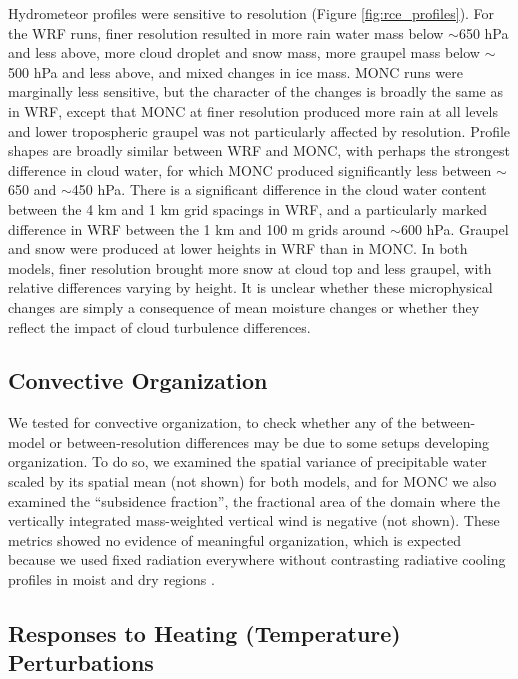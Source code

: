 \documentclass[draft]{agujournal2019}
\begin{document}
Hydrometeor profiles were sensitive to resolution (Figure
\ref{fig:rce_profiles}). For the WRF runs, finer resolution resulted in more
rain water mass below $\sim$650 hPa and less above, more cloud droplet and snow
mass, more graupel mass below $\sim$500 hPa and less above, and mixed changes in
ice mass. MONC runs were marginally less sensitive, but the character
of the changes is broadly the same as in WRF, except that MONC at finer
resolution produced more rain at all levels and lower tropospheric graupel was
not particularly affected by resolution. Profile shapes are broadly similar
between WRF and MONC, with perhaps the strongest difference in cloud water, for
which MONC produced significantly less between $\sim$650 and $\sim$450 hPa.
There is a significant difference in the cloud water content between the 4 km
and 1 km grid spacings in WRF, and a particularly marked difference in WRF
between the 1 km and 100 m grids around $\sim$600 hPa. Graupel and snow were
produced at lower heights in WRF than in MONC. In both models, finer resolution
brought more snow at cloud top and less graupel, with relative differences
varying by height. It is unclear whether these microphysical changes are simply
a consequence of mean moisture changes or whether they reflect the impact of
cloud turbulence differences.

\subsection{Convective Organization}

We tested for convective organization, to check whether any of the between-model
or between-resolution differences may be due to some setups developing
organization. To do so, we examined the spatial variance of precipitable water
scaled by its spatial mean (not shown) for both models, and for MONC we also
examined the ``subsidence fraction'', the fractional area of the domain where
the vertically integrated mass-weighted vertical wind is negative (not shown).
These metrics showed no evidence of meaningful organization, which is expected
because we used fixed radiation everywhere without contrasting radiative cooling
profiles in moist and dry regions \cite{Muller_GRL_2015}.

\subsection{Responses to Heating (Temperature) Perturbations}
\end{document}
